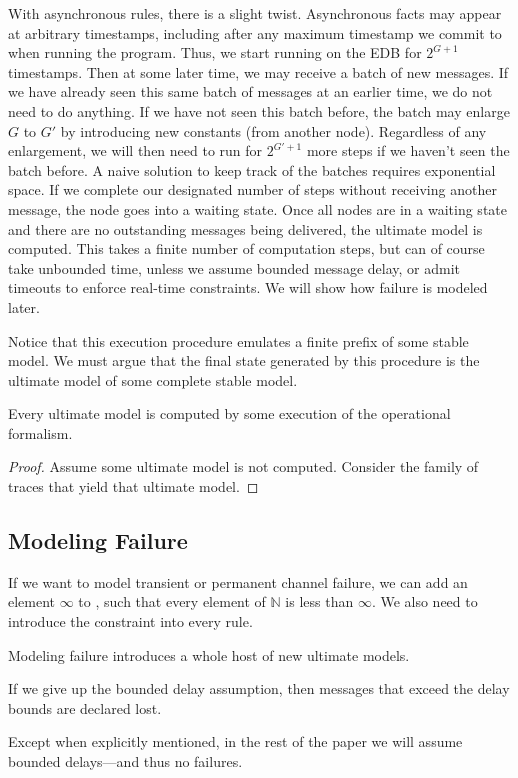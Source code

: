 With asynchronous rules, there is a slight twist.  Asynchronous facts may appear at arbitrary timestamps, including after any maximum timestamp we commit to when running the program.  Thus, we start running on the EDB for $2^{G+1}$ timestamps.  Then at some later time, we may receive a batch of new messages.  If we have already seen this same batch of messages at an earlier time, we do not need to do anything.  If we have not seen this batch before, the batch may enlarge $G$ to $G'$ by introducing new constants (from another node).  Regardless of any enlargement, we will then need to run for $2^{G'+1}$ more steps if we haven't seen the batch before.  A naive solution to keep track of the batches requires exponential space.  If we complete our designated number of steps without receiving another message, the node goes into a waiting state.  Once all nodes are in a waiting state and there are no outstanding messages being delivered, the ultimate model is computed.  This takes a finite number of computation steps, but can of course take unbounded time, unless we assume bounded message delay, or admit timeouts to enforce real-time constraints.  We will show how failure is modeled later.

Notice that this execution procedure emulates a finite prefix of some stable model.  We must argue that the final state generated by this procedure is the ultimate model of some complete stable model.

\begin{lemma}
Every ultimate model is computed by some execution of the operational formalism.
\end{lemma}
\begin{proof}
Assume some ultimate model is not computed.  Consider the family of traces that yield that ultimate model.
\end{proof}

\subsection{Modeling Failure}

If we want \lang to model transient or permanent channel failure, we can add an element $\infty$ to , such that every element of $\mathbb{N}$ is less than $\infty$.  We also need to introduce the constraint  into every \lang rule.

Modeling failure introduces a whole host of new ultimate models.

If we give up the bounded delay assumption, then messages that exceed the delay bounds are declared lost.

Except when explicitly mentioned, in the rest of the paper we will assume bounded delays---and thus no failures.
